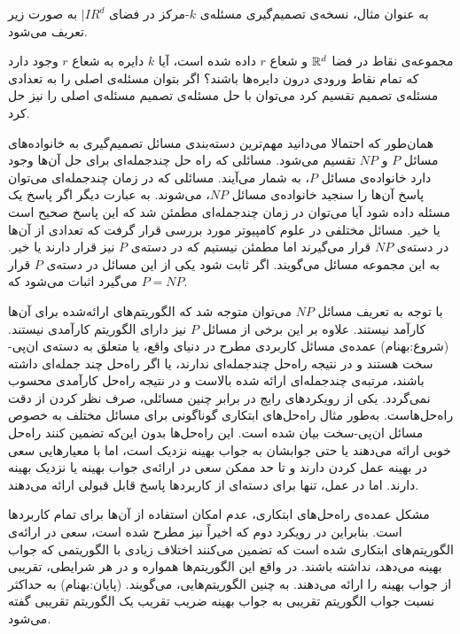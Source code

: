 به عنوان مثال، نسخه‌ی تصمیم‌گیری مسئله‌ی $k$-مرکز در فضای $|IR^d$ به صورت زیر تعریف می‌شود.

 مجموعه‌ی نقاط در فضا $\mathbb{R}^d$ و شعاع $r$ داده شده است، آیا $k$ دایره به شعاع $r$ وجود دارد که تمام نقاط ورودی درون دایره‌ها باشند؟
اگر بتوان مسئله‌ی اصلی را به تعدادی مسئله‌ی تصمیم تقسیم کرد می‌توان با حل مسئله‌ی تصمیم مسئله‌ی اصلی را نیز حل کرد.

همان‌طور که احتمالا می‌دانید مهم‌ترین دسته‌بندی مسائل تصمیم‌گیری به خانواده‌ها‌ی مسائل $P$ و $NP$ تقسیم می‌شود. 
مسائلی که راه حل چندجمله‌ای برای حل آن‌ها وجود دارد خانواده‌ی مسائل $P$، به شمار می‌آیند.
مسائلی که در زمان چند‌جمله‌ای می‌توان پاسخ آن‌ها را سنجید خانواده‌ی مسائل $NP$، می‌شوند. به عبارت دیگر اگر پاسخ یک مسئله داده شود آیا می‌توان در زمان چندجمله‌ای مطمئن شد که این پاسخ صحیح است یا خیر.
مسائل مختلفی در علوم کامپیوتر مورد بررسی قرار گرفت که تعدادی از آن‌ها در دسته‌ی $NP$ قرار می‌گیرند اما مطمئن نیستیم که در دسته‌ی $P$ نیز قرار دارند یا خیر.  به این مجموعه مسائل  می‌گویند. اگر ثابت شود یکی از این مسائل در دسته‌ی $P$ قرار می‌گیرد اثبات می‌شود که $P = NP$.

با توجه به تعریف مسائل $NP$ می‌توان متوجه شد که الگوریتم‌های ارائه‌شده برای آن‌ها کارآمد نیستند.  علاوه بر این برخی از مسائل $P$ نیز دارای الگوریتم کارآمدی نیستند.
(شروع:بهنام)
عمده‌ی مسائل کاربردی مطرح در دنیای واقع، یا متعلق به دسته‌ی ان‌پی-سخت هستند و در نتیجه راه‌حل چندجمله‌ای ندارند، یا اگر راه‌حل چند جمله‌ای داشته باشند، مرتبه‌ی چندجمله‌ای ارائه شده بالاست و در نتیجه راه‌حل کارآمدی محسوب نمی‌گردد.
یکی از رویکردهای رایج در برابر چنین مسائلی، صرف نظر کردن از دقت راه‌حل‌هاست.
به‌طور مثال راه‌حل‌های ابتکاری گوناگونی برای مسائل مختلف به خصوص مسائل ان‌پی-سخت بیان شده است.
این راه‌حل‌ها بدون این‌که تضمین کنند راه‌حل خوبی ارائه می‌دهند یا حتی جوابشان به جواب بهینه نزدیک است، اما با معیارهایی سعی در بهینه عمل کردن دارند و تا حد ممکن سعی در ارائه‌ی جواب بهینه یا نزدیک بهینه دارند.
اما در عمل، تنها برای دسته‌ای از کاربردها پاسخ قابل قبولی ارائه می‌دهند. 

مشکل عمده‌ی راه‌حل‌های ابتکاری، عدم امکان استفاده از آن‌ها برای تمام کاربردها است.
بنابراین در رویکرد دوم که اخیراً نیز مطرح شده است، سعی در ارائه‌ی الگوریتم‌های ابتکاری شده است که تضمین می‌کنند اختلاف زیادی با الگوریتمی که جواب بهینه می‌دهد، نداشته باشند.
در واقع این الگوریتم‌ها همواره و در هر شرایطی، تقریبی از جواب بهینه را ارائه می‌دهند.
به چنین الگوریتم‌هایی،  می‌گویند.
(پایان:بهنام)
به حداکثر نسبت جواب الگوریتم تقریبی به جواب بهینه ضریب تقریب یک الگوریتم تقریبی گفته می‌شود.

